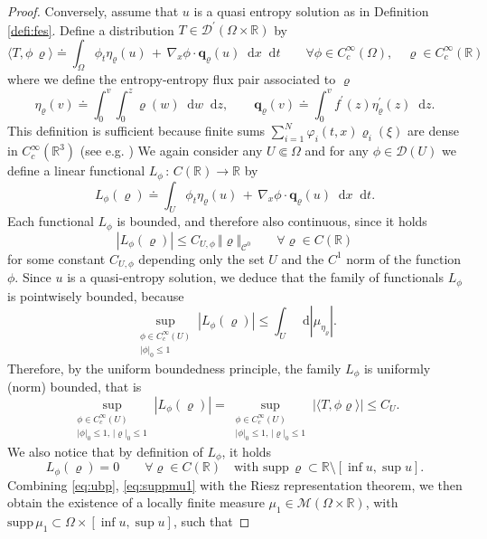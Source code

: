 \documentclass[11pt, twoside, reqno]{amsart}
\theoremstyle{definition}
\theoremstyle{remark}
\numberwithin{equation}{section}
\newcommand*\dif{\mathop{}\!\mathrm{d}}
\newcommand{\mc}[1]{\mathcal{#1}}
\newcommand{\mr}[1]{\mathrm{#1}}
\newcommand{\bs}[1]{\boldsymbol{#1}}
\newcommand{\msc}[1]{\mathscr{#1}}
\begin{document}
\begin{proof}
 Conversely, assume that $u$ is a quasi entropy solution as in Definition \ref{defi:fes}. Define a distribution $T \in \msc D^\prime(\Omega \times \mathbb R)$ by 
 $$
 \langle T, \phi\, \varrho \rangle \doteq \int_{\Omega} \phi_t \eta_{\varrho}(u)\,  +\, \nabla_x \phi\cdot   \bs q_\varrho(u) \dif x \dif t \qquad \forall \phi \in C^\infty_c(\Omega), \quad \varrho \in C^\infty_c(\mathbb R)
 $$
 where we define the entropy-entropy flux pair associated to $\varrho$
 $$
 \eta_{\varrho}(v) \doteq \int_0^v \int_0^z \varrho(w) \dif w \dif z, \qquad \bs q_\varrho(v) \doteq \int_0^v f^\prime(z) \eta^\prime_\varrho(z)  \dif z.
 $$
 This definition is sufficient because finite sums $\sum_{i=1}^N \varphi_i(t,x) \varrho_i(\xi)$ are dense in $C_c^{\infty}(\mathbb R^3)$ (see e.g. \cite[Section 4.3]{FJ99})
We again consider any $U \Subset \Omega$ and for any $\phi \in \msc D(U)$ we define a linear functional $L_\phi \, : \,  C(\mathbb R) \to \mathbb R$ by 
$$
L_\phi(\varrho) \doteq   \int_{U} \phi_t \eta_{\varrho}(u)\,  +\, \nabla_x \phi\cdot   \bs q_\varrho(u) \dif x \dif t.
$$
Each functional $L_\phi$ is bounded, and therefore also continuous, since it holds
$$
|L_\phi(\varrho)| \leq C_{U, \phi} \, \Vert \varrho\Vert_{\mc C^0} \qquad \forall \varrho \in  C(\mathbb R)
$$
for some constant $C_{U, \phi}$ depending only the set $U$ and the $C^1$ norm of the function $\phi$.
Since $u$ is a quasi-entropy solution, we deduce that the family  of functionals $L_\phi$ is pointwisely bounded, because
$$
\sup_{\substack{\phi \in C^\infty_c(U) \\ |\phi|_0 \leq 1} } |L_\phi(\varrho)| \leq \int_U \dif |\mu_{\eta_\varrho}|.
$$
Therefore, by the uniform boundedness principle, the family $L_\phi$ is uniformly (norm) bounded, that is
\begin{equation}\label{eq:ubp}
    \sup_{\substack{\phi \in C^\infty_c(U) \\ |\phi|_0 \leq 1, \,|\varrho|_0 \leq 1} } |L_\phi(\varrho)| = \sup_{\substack{\phi \in C^\infty_c(U) \\ |\phi|_0 \leq 1, \,|\varrho|_0 \leq 1} } |\langle T, \phi \varrho\rangle|  \leq C_U.
\end{equation}
We also notice that by definition of $L_\phi$, it holds
\begin{equation}\label{eq:suppmu1}
L_\phi(\varrho)  = 0 \qquad \forall \varrho \in  C(\mathbb R) \quad \text{with $\mr{supp}\, \varrho \subset \mathbb R \setminus [\inf u, \sup u]$}.
\end{equation}
Combining \eqref{eq:ubp}, \eqref{eq:suppmu1} with the Riesz representation theorem, we then obtain the existence of a locally finite measure $\mu_1 \in \msc M(\Omega \times \mathbb R)$, with $\mr{supp}\, \mu_1 \subset \Omega \times [\inf u, \sup u]$, such that 

\end{proof}
\end{document}
